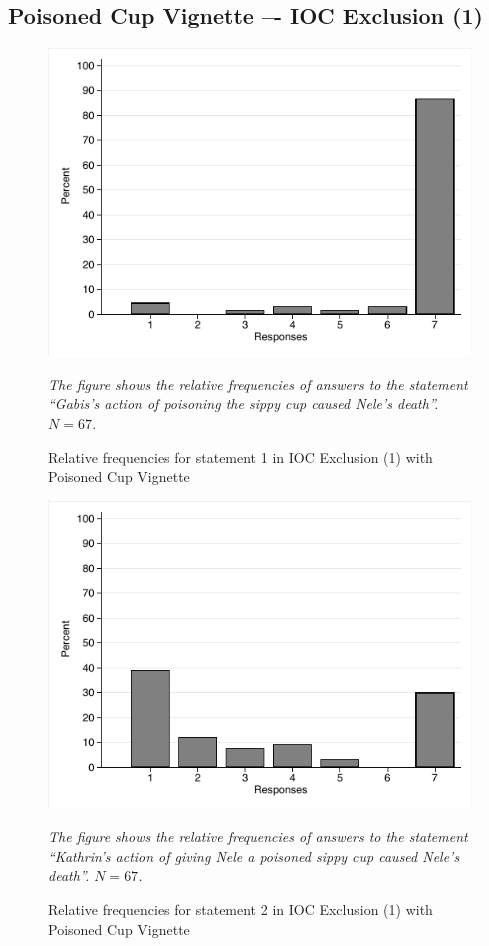 \documentclass[egregdoesnotlikesansseriftitles,12pt]{scrartcl}
\begin{document}
\subsection{Poisoned Cup Vignette –- IOC Exclusion (1)}
\begin{figure}[H]
   \centering
   \includegraphics[scale=0.8]{figures/cup_ioc_1_hist_1.pdf}
   \begin{minipage}{0.9\linewidth}
   \footnotesize
   \emph{The figure shows the relative frequencies of answers to the statement ``Gabis's action of poisoning the sippy cup caused Nele's death''. $N=67$.}
   \end{minipage}
   \caption{Relative frequencies for statement 1 in IOC Exclusion (1) with Poisoned Cup Vignette}
   \label{fig:cup_ioc_1_hist_1}
\end{figure}

\begin{figure}[H]
   \centering
   \includegraphics[scale=0.8]{figures/cup_ioc_1_hist_2.pdf}
   \begin{minipage}{0.9\linewidth}
   \footnotesize
   \emph{The figure shows the relative frequencies of answers to the statement ``Kathrin's action of giving Nele a poisoned sippy cup caused Nele's death''. $N=67$.}
   \end{minipage}
   \caption{Relative frequencies for statement 2 in IOC Exclusion (1) with Poisoned Cup Vignette}
   \label{fig:cup_ioc_1_hist_2}
\end{figure}
\end{document}
